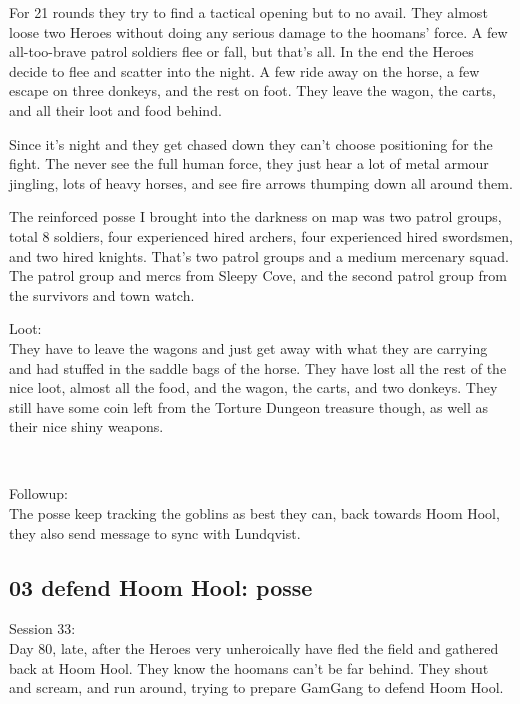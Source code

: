 For 21 rounds they try to find a tactical opening but to no avail. They almost loose two Heroes without doing any serious damage to the hoomans' force. A few all-too-brave patrol soldiers flee or fall, but that's all. In the end the Heroes decide to flee and scatter into the night. A few ride away on the horse, a few escape on three donkeys, and the rest on foot. They leave the wagon, the carts, and all their loot and food behind.

\begin{readoutloud}
Since it's night and they get chased down they can't choose positioning for the fight. The never see the full human force, they just hear a lot of metal armour jingling, lots of heavy horses, and see fire arrows thumping down all around them.

The reinforced posse I brought into the darkness on map was two patrol groups, total 8 soldiers, four experienced hired archers, four experienced hired swordsmen, and two hired knights. That's two patrol groups and a medium mercenary squad. The patrol group and mercs from Sleepy Cove, and the second patrol group from the survivors and town watch.
\end{readoutloud}


Loot:\\
They have to leave the wagons and just get away with what they are carrying and had stuffed in the saddle bags of the horse. They have lost all the rest of the nice loot, almost all the food, and the wagon, the carts, and two donkeys. They still have some coin left from the Torture Dungeon treasure though, as well as their nice shiny weapons.

\

Followup:\\
The posse keep tracking the goblins as best they can, back towards Hoom Hool, they also send message to sync with Lundqvist.


\subsection*{03 defend Hoom Hool: posse}

\forceindent Session 33:\\                                              %
Day 80, late, after the Heroes very unheroically have fled the field and gathered back at Hoom Hool. They know the hoomans can't be far behind. They shout and scream, and run around, trying to prepare GamGang to defend Hoom Hool.

